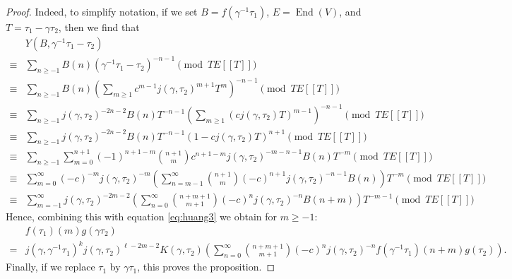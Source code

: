 \documentclass[10pt,a4paper]{amsart}
\DeclareMathOperator{\Endo}{End}
\providecommand{\pseries}[2]{#1[\![ #2 ]\!]}
\begin{document}
\begin{proof}
    Indeed, to simplify notation, if we set $B = f(\gamma^{-1}\tau_1)$, $E = \Endo(V)$, and $T=\tau_1-\gamma\tau_2$, then we find that
    \begin{align*}
    &Y(B,\gamma^{-1}\tau_1-\tau_2)\\
    \equiv& \sum_{n\geq -1} B(n) (\gamma^{-1}\tau_1-\tau_2)^{-n-1}\pmod{T\pseries{E}{T}}\\
    \equiv& \sum_{n\geq -1} B(n) \left(\sum_{m\geq 1} c^{m-1}j(\gamma,\tau_2)^{m+1}T^m\right)^{-n-1}\pmod{T\pseries{E}{T}}\\
    \equiv& \sum_{n\geq -1} j(\gamma,\tau_2)^{-2n-2}B(n)T^{-n-1} \left(\sum_{m\geq 1} \left(cj(\gamma,\tau_2)T\right)^{m-1}\right)^{-n-1}\pmod{T\pseries{E}{T}}\\
    \equiv& \sum_{n\geq -1} j(\gamma,\tau_2)^{-2n-2}B(n)T^{-n-1} \left(1-cj(\gamma,\tau_2)T\right)^{n+1}\pmod{T\pseries{E}{T}}\\
    \equiv& \sum_{n\geq -1}\sum_{m=0}^{n+1}(-1)^{n+1-m}\binom{n+1}{m}c^{n+1-m} j(\gamma,\tau_2)^{-m-n-1}B(n)T^{-m} \pmod{T\pseries{E}{T}}\\
    \equiv& \sum_{m=0}^\infty(-c)^{-m}j(\gamma,\tau_2)^{-m}\left(\sum_{n=m-1}^\infty\binom{n+1}{m}(-c)^{n+1} j(\gamma,\tau_2)^{-n-1}B(n)\right)T^{-m} \pmod{T\pseries{E}{T}}\\
    \equiv& \sum_{m=-1}^\infty j(\gamma,\tau_2)^{-2m-2}\left(\sum_{n=0}^\infty\binom{n+m+1}{m+1}(-c)^{n} j(\gamma,\tau_2)^{-n}B(n+m)\right)T^{-m-1} \pmod{T\pseries{E}{T}}
    \end{align*}
    Hence, combining this with equation \eqref{eq:huang3} we obtain for $m\geq -1$:
    \begin{align}
        \label{eq:prodtransformation}
        &f(\tau_1)(m)g(\gamma\tau_2)\\
        \nonumber =&j(\gamma,\gamma^{-1}\tau_1)^kj(\gamma,\tau_2)^{\ell-2m-2}K(\gamma,\tau_2)\left(\sum_{n=0}^{\infty}\binom{n+m+1}{m+1}(-c)^nj(\gamma,\tau_2)^{-n}f(\gamma^{-1}\tau_1)(n+m)g(\tau_2)\right).
    \end{align}
    Finally, if we replace $\tau_1$ by $\gamma \tau_1$, this proves the proposition.
    \end{proof}
\end{document}
